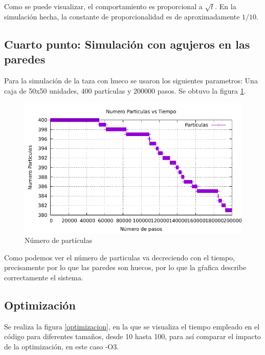 \documentclass{article}
\begin{document}
\begin{multicols}{2}
Como se puede visualizar, el comportamiento es proporcional a $\sqrt{t}$. En la simulación hecha, la constante de proporcionalidad es de aproximadamente $1/10$.

\subsection*{Cuarto punto: Simulación con agujeros en las paredes}

Para la simulación de la taza con hueco se usaron los siguientes parametros: Una caja de 50x50 unidades, 400 partículas y 200000 pasos. Se obtuvo la figura  \ref{numero_particulas}.



\begin{figure}[H]
    \centering
    \includegraphics[width=\columnwidth]{punto_4.pdf}
    \caption{Número de partículas}
    \label{numero_particulas}
\end{figure}

Como podemos ver el número de particulas va decreciendo con el tiempo, precisamente por lo que las paredes son huecos, por lo que la gŕafica describe correctamente el sistema.

\subsection*{Optimización}

Se realiza la figura \ref{optimizacion}, en la que se visualiza el tiempo empleado en el código para diferentes tamaños, desde 10 hasta 100, para así comparar el impacto de la optimización, en este caso -O3.
 

\end{multicols}
\end{document}
